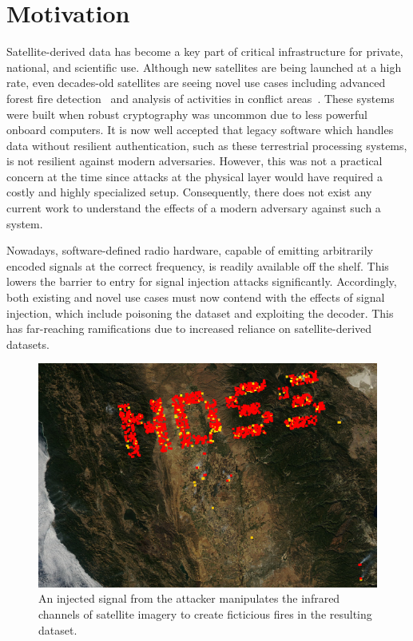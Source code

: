 \section{Motivation}

Satellite-derived data has become a key part of critical infrastructure for private, national, and scientific use.
Although new satellites are being launched at a high rate, even decades-old satellites are seeing novel use cases including advanced forest fire detection~\cite{nasaFirms} and analysis of activities in conflict areas~\cite{separatistLuminosity}. %
These systems were built when robust cryptography was uncommon due to less powerful onboard computers.
It is now well accepted that legacy software which handles data without resilient authentication, such as these terrestrial processing systems, is not resilient against modern adversaries.
However, this was not a practical concern at the time since attacks at the physical layer would have required a costly and highly specialized setup.
Consequently, there does not exist any current work to understand the effects of a modern adversary against such a system.

Nowadays, software-defined radio hardware, capable of emitting arbitrarily encoded signals at the correct frequency, is readily available off the shelf. %
This lowers the barrier to entry for signal injection attacks significantly.
Accordingly, both existing and novel use cases must now contend with the effects of signal injection, which include poisoning the dataset and exploiting the decoder.
This has far-reaching ramifications due to increased reliance on satellite-derived datasets.

\begin{figure}
    \includegraphics[width=\columnwidth]{diagrams/injection/pixels_800_140.jpg}
    \caption{An injected signal from the attacker manipulates the infrared channels of satellite imagery to create ficticious fires in the resulting dataset.}
    \label{fig:location-injection}
\end{figure}

